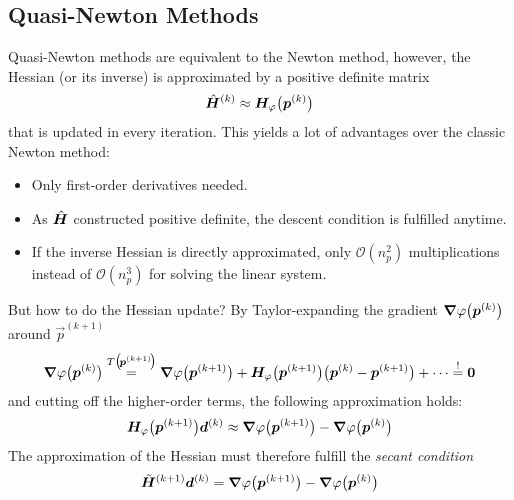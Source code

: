 		\subsection{Quasi-Newton Methods}
			Quasi-Newton methods are equivalent to the Newton method, however, the Hessian (or its inverse) is approximated by a positive definite matrix
			\begin{align*}
				\hat{\bm{H}}^{(k)} \approx \bm{H}_\varphi\big(\bm{p}^{(k)}\big)
			\end{align*}
			that is updated in every iteration. This yields a lot of advantages over the classic Newton method:
			\begin{itemize}
				\item Only first-order derivatives needed.
				\item As \( \hat{\bm{H}} \) constructed positive definite, the descent condition is fulfilled anytime.
				\item If the inverse Hessian is directly approximated, only \( \mathcal{O}(n_p^2) \) multiplications instead of \( \mathcal{O}(n_p^3) \) for solving the linear system.
			\end{itemize}

			But how to do the Hessian update? By Taylor-expanding the gradient \( \grad{\varphi}\big(\bm{p}^{(k)}\big) \) around \( \vec{p}^{(k + 1)} \)
			\begin{align*}
				\grad{\varphi}\big(\bm{p}^{(k)}\big) \overset{T\big(\!\bm{p}^{(k + 1)}\!\big)}{=} \grad{\varphi}\big(\bm{p}^{(k + 1)}\big) + \bm{H}_\varphi\big(\bm{p}^{(k + 1)}\big) \big( \bm{p}^{(k)} - \bm{p}^{(k + 1)} \big) + \cdots \overset{!}{=} \bm{0}
			\end{align*}
			and cutting off the higher-order terms, the following approximation holds:
			\begin{align*}
				\bm{H}_\varphi\big(\bm{p}^{(k + 1)}\big) \bm{d}^{(k)} \approx \grad{\varphi}\big(\bm{p}^{(k + 1)}\big) - \grad{\varphi}\big(\bm{p}^{(k)}\big)
			\end{align*}
			The approximation of the Hessian must therefore fulfill the \emph{secant condition}
			\begin{align*}
				\tilde{\bm{H}}^{(k + 1)} \bm{d}^{(k)} = \grad{\varphi}\big(\bm{p}^{(k + 1)}\big) - \grad{\varphi}\big(\bm{p}^{(k)}\big)
			\end{align*}

